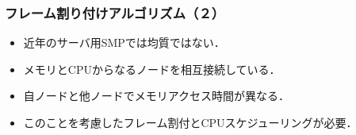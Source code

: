 \documentclass[unicode,handout]{beamer}                   %
\begin{document}
\begin{frame}
  \frametitle{フレーム割り付けアルゴリズム（２）}
  \begin{itemize}
  \item 近年のサーバ用SMPでは均質ではない．
  \item メモリとCPUからなるノードを相互接続している．
  \item 自ノードと他ノードでメモリアクセス時間が異なる．
  \item このことを考慮したフレーム割付とCPUスケジューリングが必要．
  \end{itemize}
\end{frame}
\end{document}
